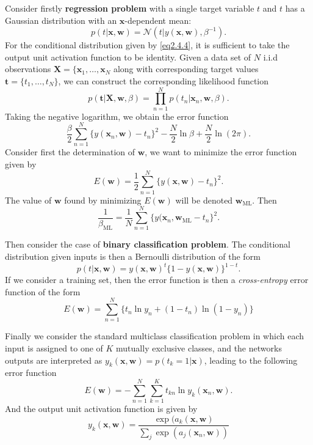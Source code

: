 \documentclass{article}
\newcommand{\normD}{\mathcal{N}}
\newcommand{\mrm}{\mathrm}
\newcommand{\mbf}{\mathbf}
\newcommand{\XX}{\mbf X}
\newcommand{\ww}{\mbf w}
\newcommand{\ttt}{\mbf t}
\newcommand{\xx}{\mbf x}
\newcommand{\rev}{^{-1}}
\begin{document}
Consider firstly \textbf{regression problem} with a single target variable $t$ and $t$ has a Gaussian distribution with an $\xx$-dependent mean:
\begin{equation}\label{eq2.4.4}
p(t|\xx,\ww)=\normD(t|y(\xx,\ww), \beta\rev).
\end{equation}
For the conditional distribution given by \ref{eq2.4.4}, it is sufficient to take the output unit activation function to be identity. Given a data set of $N$  i.i.d observations $\XX =\{\xx_1,\dots,\xx_N$ along with corresponding target values $\ttt = \{t_1,\dots,t_N\}$, we can construct the corresponding likelihood function
\begin{equation}\label{}
  p(\ttt|\XX,\ww,\beta)=\prod_{n=1}^{N}p(t_n|\xx_n,\ww,\beta).
\end{equation}
Taking the negative logarithm, we obtain the error function
\begin{equation}\label{}
  \frac{\beta}{2}\sum_{n=1}^{N}\{y(\xx_n,\ww)-t_n\}^2-\frac{N}{2}\ln \beta+\frac N2\ln(2\pi).
\end{equation}
Consider first the determination of $\ww$, we want to minimize the error function given by
\begin{equation}\label{}
  E(\ww)=\frac12\sum_{n=1}^{N}\{y(\xx,\ww)-t_n\}^2.
\end{equation}
The value of $\ww$ found by minimizing $E(\ww)$ will be denoted $\ww_{\mrm{ML}}$. Then
\begin{equation}\label{}
  \frac{1}{\beta_{\mrm{ML}}}=\frac1N\sum_{n=1}^{N}\{y(\xx_n,\ww_{\mrm{ML}}-t_n\}^2.
\end{equation}

Then consider the case of \textbf{binary classification problem}. The conditional distribution given inputs is then a Bernoulli distribution of the form
\begin{equation}\label{}
  p(t|\xx,\ww) = y(\xx,\ww)^t\{1-y(\xx,\ww)\}^{1-t}.
\end{equation}
If we consider a training set, then the error function is then a \textit{cross-entropy} error function  of the form
\begin{equation}\label{}
  E(\ww) = \sum_{n=1}^{N}\{t_n\ln y_n+(1-t_n)\ln (1-y_n)\}
\end{equation}

Finally we consider the standard multiclass classification problem in which each input is assigned to one of $K$ mutually exclusive classes, and the networks outputs are interpreted as $y_k(\xx,\ww) = p(t_k=1|\xx)$, leading to the following error function
\begin{equation}\label{}
  E(\ww) = -\sum_{n=1}^{N}\sum_{k=1}^{K}t_{kn}\ln y_k(\xx_n,\ww).
\end{equation}
And the output unit activation function is given by
\begin{equation}\label{}
  y_k(\xx,\ww) = \frac{\exp(a_k(\xx,\ww)}{\sum_j\exp(a_j(\xx_n,\ww))}
\end{equation}
\end{document}
